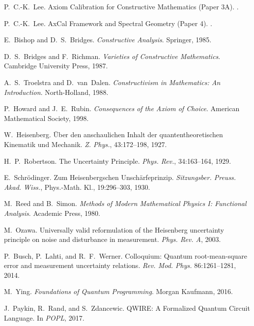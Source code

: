 \documentclass[11pt]{article}
\theoremstyle{plain}
\theoremstyle{definition}
\theoremstyle{remark}
\begin{document}

\begin{thebibliography}{99}

P.~C.-K.~Lee.
\newblock Axiom Calibration for Constructive Mathematics (Paper 3A).
.

P.~C.-K.~Lee.
\newblock AxCal Framework and Spectral Geometry (Paper 4).
.

E.~Bishop and D.~S.~Bridges.
\newblock \emph{Constructive Analysis}.
\newblock Springer, 1985.

D.~S.~Bridges and F.~Richman.
\newblock \emph{Varieties of Constructive Mathematics}.
\newblock Cambridge University Press, 1987.

A.~S.~Troelstra and D.~van~Dalen.
\newblock \emph{Constructivism in Mathematics: An Introduction}.
\newblock North-Holland, 1988.

P.~Howard and J.~E.~Rubin.
\newblock \emph{Consequences of the Axiom of Choice}.
\newblock American Mathematical Society, 1998.

W.~Heisenberg.
\newblock \"Uber den anschaulichen Inhalt der quantentheoretischen Kinematik und Mechanik.
\newblock \emph{Z. Phys.}, 43:172--198, 1927.

H.~P.~Robertson.
\newblock The Uncertainty Principle.
\newblock \emph{Phys. Rev.}, 34:163--164, 1929.

E.~Schr\"odinger.
\newblock Zum Heisenbergschen Unsch\"arfeprinzip.
\newblock \emph{Sitzungsber. Preuss. Akad. Wiss.}, Phys.-Math. Kl., 19:296--303, 1930.

M.~Reed and B.~Simon.
\newblock \emph{Methods of Modern Mathematical Physics I: Functional Analysis}.
\newblock Academic Press, 1980.

M.~Ozawa.
\newblock Universally valid reformulation of the Heisenberg uncertainty principle on noise and disturbance in measurement.
\newblock \emph{Phys. Rev. A}, 2003.

P.~Busch, P.~Lahti, and R.~F.~Werner.
\newblock Colloquium: Quantum root-mean-square error and measurement uncertainty relations.
\newblock \emph{Rev. Mod. Phys.} 86:1261--1281, 2014.

M.~Ying.
\newblock \emph{Foundations of Quantum Programming}.
\newblock Morgan Kaufmann, 2016.

J.~Paykin, R.~Rand, and S.~Zdancewic.
\newblock QWIRE: A Formalized Quantum Circuit Language.
\newblock In \emph{POPL}, 2017.

\end{thebibliography}
\end{document}
